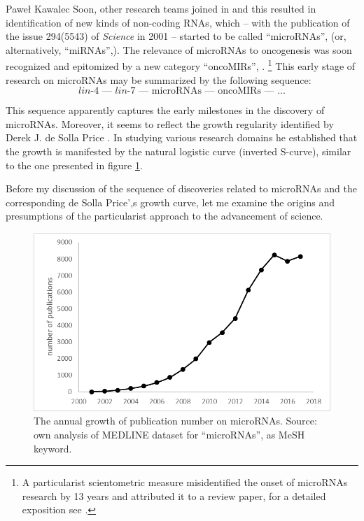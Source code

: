 \begin{artengenv}{Paweł Kawalec}
Soon, other research teams joined in and this resulted in identification of new kinds of non-coding RNAs, which -- with the publication of the issue 294(5543) of \textit{Science} in 2001 -- started to be called ``microRNAs'', (or, alternatively, ``miRNAs'',). The relevance of microRNAs to oncogenesis was soon recognized
\parencite[][]{calin_frequent_2002} %
 and epitomized by a new category ``oncoMIRs'', 
\parencite[][]{he_oncomir_2019}.%
\footnote{A particularist scientometric measure misidentified the onset of microRNAs research by 13 years and attributed it to a review paper, for a detailed exposition see 
\parencite[][]{giovagnoli_cognitive_2020}.%
} This early stage of research 
\parencite[][]{kawalec_transformations_2018} %
 on microRNAs may be summarized by the following sequence:
$$
\textit{lin-4 –– lin-7}\text{ –– microRNAs –– oncoMIRs –– \ldots}
$$

This sequence apparently captures the early milestones in the discovery of microRNAs. Moreover, it seems to reflect the growth regularity identified by Derek J. de Solla Price
\parencite[de][]{de_solla_price_little_1986}. %
 In studying various research domains he established that the growth is manifested by the natural logistic curve (inverted S-curve), similar to the one presented in figure \ref{fig1kawalec}.

Before my discussion of the sequence of discoveries related to microRNAs and the corresponding de Solla Price',s growth curve, let me examine the origins and presumptions of the particularist approach to the advancement of science.
\begin{figure}[h!]
	\includegraphics[width=1\textwidth]{ART_Kawalec/Kawalec-img001bw.png}
	\caption{The annual growth of publication number on microRNAs. Source: own analysis of MEDLINE dataset for ``microRNAs'', as MeSH keyword.}\label{fig1kawalec}
\end{figure}




\end{artengenv}
